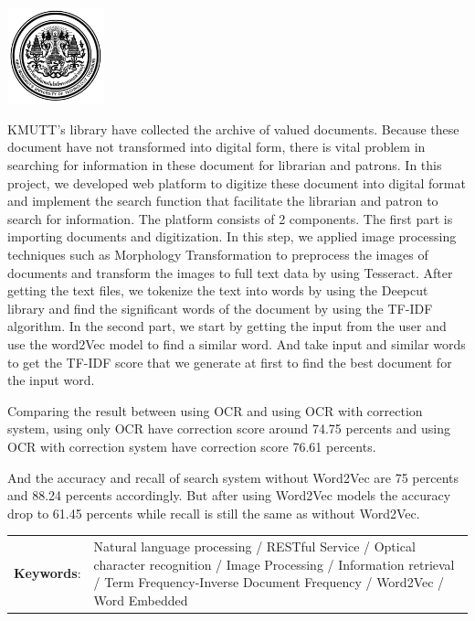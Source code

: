 \documentclass[12pt,oneside,openright,a4paper]{cpe-thai-project}
\begin{document}
\pdfstringdefDisableCommands{%
\let\MakeUppercase\relax
}
\begin{center}
\includegraphics[width=2.8cm]{logo02.jpg}
\end{center}
\vspace*{-1cm}
\maketitlepage
\makesignaturepage 

\abstract

KMUTT's library have collected the archive of valued documents. 
Because these document have not transformed into digital form, 
there is vital problem in searching for information in these 
document for librarian and patrons. In this project, we developed 
web platform to digitize these document into digital format 
and implement the search function that facilitate the librarian 
and patron to search for information. The platform consists of 
2 components. The first part is importing documents and 
digitization. In this step, we applied image processing 
techniques such as Morphology Transformation to preprocess
the images of documents and transform the images to full text 
data by using Tesseract. After getting the text files, we tokenize 
the text into words by using the Deepcut library and find the 
significant words of the document by using the TF-IDF algorithm. 
In the second part, we start by getting the input from the user 
and use the word2Vec model to find a similar word. And take 
input and similar words to get the TF-IDF score that we 
generate at first to find the best document for the input word.  

Comparing the result between using OCR and using OCR with correction system, 
using only OCR have correction score around 74.75 percents and using OCR with correction system
have correction score 76.61 percents.

And the accuracy and recall of search system without Word2Vec are 75 percents and 88.24 percents accordingly.
But after using Word2Vec models the accuracy drop to 61.45 percents while recall is still the same as without Word2Vec.

\begin{flushleft}
\begin{tabular*}{\textwidth}{@{}lp{}}
\textbf{Keywords}: & Natural language processing / RESTful Service / Optical character recognition / Image Processing / Information retrieval / Term Frequency-Inverse Document Frequency / Word2Vec / Word Embedded 
\end{tabular*}
\end{flushleft}
\endabstract
\end{document}
